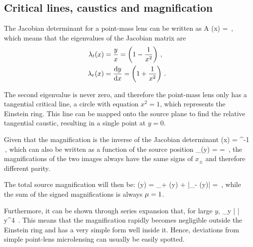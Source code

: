 \subsection{Critical lines, caustics and magnification}
\label{subsec:critlines_caustics}
The Jacobian determinant for a point-mass lens can be written as
\be
\label{eq:3.8}
\det A (x) =   \,,
\ee
which means that the eigenvalues of the Jacobian matrix are
\begin{subequations}
\begin{align}
    \label{eq:3.9a}
    \lambda_t (x) & = \frac{y}{x} = \left( 1 - \frac{1}{x^2} \right) \,,
    \\
    \label{eq:3.9b}
    \lambda_r (x) & = \frac{\dd{y}}{\dd{x}} = \left( 1 + \frac{1}{x^2} \right) \,.
\end{align}
\end{subequations}

The second eigenvalue is never zero, and therefore the point-mass lens only has a tangential critical line, a circle with equation $x^2 = 1$, which represents the Einstein ring.
This line can be mapped onto the source plane to find the relative tangential caustic, resulting in a single point at $y = 0$.

Given that the magnification is the inverse of the Jacobian determinant
\be
\label{eq:3.10}
\m (x) = ^{-1} \,,
\ee
which can also be written as a function of the source position
\be
\label{eq:3.11}
\m_\pm (y) =   =   \,,
\ee
the magnifications of the two images always have the same signs of $x_\pm$ and therefore different parity.

The total source magnification will then be:
\be
\label{eq:3.12}
\m (y) = \m_+ (y)  + |\m_- (y)| =  \,,
\ee
while the sum of the signed magnifications is always $\mu = 1$.

Furthermore, it can be shown through series expansion that, for large $y$,
\be
\label{eq:3.13}
\lim_{y\to\infty} \left| \frac{\m_+}{\m_-} \right| \propto y^4 \,.
\ee
This means that the magnification rapidly becomes negligible outside the Einstein ring and has a very simple form well inside it. Hence, deviations from simple point-lens microlensing can usually be easily spotted.


